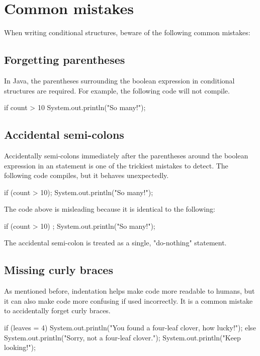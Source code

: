 \section{Common mistakes}
When writing conditional structures, beware of the following common  mistakes:

\subsection{Forgetting parentheses}
In Java, the parentheses surrounding the boolean expression in conditional structures are required. For example, the following code will not compile.
\begin{code}
if count > 10
    System.out.println("So many!");
\end{code}

\subsection{Accidental semi-colons}
Accidentally semi-colons immediately after the parentheses around the boolean expression in an  statement is one of the trickiest mistakes to detect. The following code compiles, but it behaves unexpectedly. 
\begin{code}
if (count > 10);
    System.out.println("So many!");
\end{code}

The code above is misleading because it is identical to the following:
\begin{code}
if (count > 10) {
    ;
}
System.out.println("So many!");
\end{code}

The accidental semi-colon is treated as a single, "do-nothing" statement.

\subsection{Missing curly braces}
As mentioned before, indentation helps make code more readable to humans, but it can also make code more confusing if used incorrectly. It is a common mistake to accidentally forget curly braces.

\begin{code}
if (leaves = 4) {
    System.out.println("You found a four-leaf clover, how lucky!");
} else
    System.out.println("Sorry, not a four-leaf clover.");
    System.out.println("Keep looking!");
\end{code}

